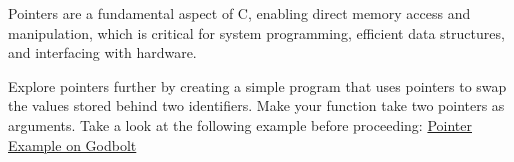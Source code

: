 \documentclass{dcbl/challenge}
\begin{document}
\begin{aufgabe}
Pointers are a fundamental aspect of C, enabling direct memory access and manipulation, which is critical for system programming, efficient data structures, and interfacing with hardware.

Explore pointers further by creating a simple program that uses pointers to swap the values stored behind two identifiers.
Make your function take two pointers as arguments.
Take a look at the following example before proceeding: \href{https://godbolt.org/#z:OYLghAFBqd5QCxAYwPYBMCmBRdBLAF1QCcAaPECAMzwBtMA7AQwFtMQByARg9KtQYEAysib0QXACx8BBAKoBnTAAUAHpwAMvAFYTStJg1DIApACYAQuYukl9ZATwDKjdAGFUtAK4sGIAMxmpK4AMngMmAByPgBGmMQgZkEADqgKhE4MHt6%2BASlpGQJhEdEscQlJtpj2jgJCBEzEBNk%2BfoFVNZn1jQTFUbHxiUEKDU0tue0jPX2l5UMAlLaoXsTI7Bzm/uHI3lgm/m4j%2BKgAdAj72CYaAIKb27uY%2B4cE6DGonmcXV7c33%2BEEAGoWExwhB5iYAOxWG4A2EA/5wgEAN0aXAB%2BwAIgCuPtoddEQoECRAcjGmZ0f4sVwzLjvoiEXCUcR/BSqWZ/LSYXDaAJgIzGpJWdj2ZJOfjubyATyjKTiABWIXU/ySOVixEAfQs71osoAbIrcQCAPRGgEAdSYCDIAPQTD1AIYeGQCEBGnhIzpcKoPKYgKZEMV7JOKt1arh6GWMXosoAHIHlSc5bqITGxZ7YcliP8qBBzGYzfE/QJ0XK3Bp/By5RZJBpcVwWLK0YjYSB0WY5egS2WKyYqxoWL23Aw86RG%2BD/HjEZns7mktd0MRMAolMji4Py5Xq7WJ/XG82Aa3zHLkl2N72LP3B8PKm3dUyuOPJ3Dp4Ic3mC01VwxTz2q5JRTuDZMuS%2B6Hu2nbrr%2BF4DqW15BLKZiPumAIvgQb5zguS4rkia6lmef4ARYu7AaBbbHj%2Bm6XrBI63sBSFchmWavrO%2BaFl%2BFHniqdZAY0LKkUeEF4VBVFDjRTL%2BPR4qMTOebzouy6YOxkGblxgGynxiJgeRynniJcGjuYd68ZJU5MWhLEfkW346X%2BOJqUygr8e2tCCd2lEwaJN4OSZz5mehZhyVhik4dZQkqXZRE8cQjmaWRJ42dBV40YZ3lhtJzHvmxIUcX%2B26RbKCpOXKtAuTliXUV5jRyj56XmbJmEKUpYWcXlxFVUV8XNX2Hn6bRVU1ShfkWVluFuZxhFtcQ%2BpFa5%2BHlZ58FMrqA2of5gWNdlCX/tx9rNlpnVjd1SU3iljTLWlg0yUkllNYd1aqvZjQBkVVBlXpYlPStQ31fJ2GjXNqn5f6HVvT1yVmEZxAQl9V2sZ%2Bm1ddWEWTXGRW0K9CXvZVxAxjDGUYb9wX/VBkjI1FqOxUeB1zVj8GnTjknIYuBArN%2BeXfJCGLfBwiy0Jwcq8H4HBaKQqCcG41jWACCjLKsimbDwpAEJoPOLAA1iAcoAJwnGYKa6lwWta7qMa6v4SYqvonCSILKui5wvAKCAGhKyrixwLASCYKomDIF4RBkBQECNMACjKIY1RCESADuQuK2gLDJHQvqZOHES0FHqCx3bCdJ/QCTAFwGhBLndDxJErDrLwpf5wA8v7mfZ8LvDe771zEKHDvBD7yD1PgQu8PwggiGI7BSDIgiKCo6jN6QuhcPohjGJLlj6HgMRO5AiyoMktQME7HC8KgSLxFmWCb2CpDEF4gh4GwAAq2oX4sMsrGsehHOEaeRzHce8NHxAmDJE4DwXm/NbazzFhwbAPd/YkABKoU2ABaXUgpgDIGQNiDQusAQQAlpYawo5cCEHgQreYvBlbN3mOrEANYTgQjMFwfwMYNDliYag82corYcBtqQIWIsoGO2dq7KhYCOBmAgQIrulCtDUNICfYg6RnCSCAA%3D%3D%3D}{Pointer Example on Godbolt}

\end{aufgabe}
\end{document}

